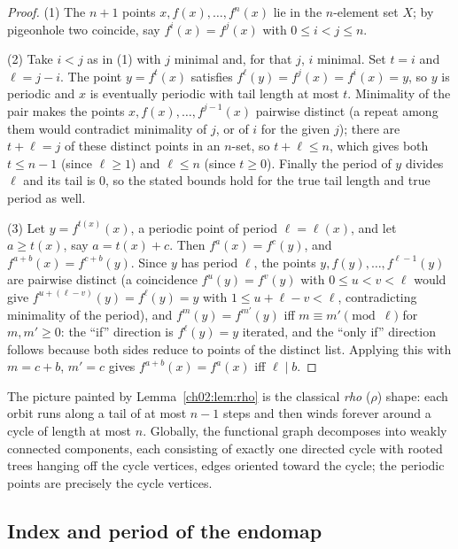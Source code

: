 \begin{proof}
(1) The $n + 1$ points $x, f(x), \dots, f^n(x)$ lie in the $n$-element set
$X$; by pigeonhole two coincide, say $f^i(x) = f^j(x)$ with
$0 \leq i < j \leq n$.

(2) Take $i < j$ as in (1) with $j$ minimal and, for that $j$, $i$
minimal. Set $t = i$ and $\ell = j - i$. The point $y = f^t(x)$
satisfies $f^\ell(y) = f^{j}(x) = f^{i}(x) = y$, so $y$ is periodic and
$x$ is eventually periodic with tail length at most $t$. Minimality of the
pair makes the points $x, f(x), \dots, f^{j-1}(x)$ pairwise distinct
(a repeat among them would contradict minimality of $j$, or of $i$ for the
given $j$); there are $t + \ell = j$ of these distinct points in an
$n$-set, so $t + \ell \leq n$, which gives both $t \leq n - 1$ (since
$\ell \geq 1$) and $\ell \leq n$ (since $t \geq 0$). Finally the period of
$y$ divides $\ell$ and its tail is $0$, so the stated bounds hold for the
true tail length and true period as well.

(3) Let $y = f^{t(x)}(x)$, a periodic point of period $\ell = \ell(x)$,
and let $a \geq t(x)$, say $a = t(x) + c$. Then $f^a(x) = f^c(y)$, and
$f^{a+b}(x) = f^{c + b}(y)$. Since $y$ has period $\ell$, the points
$y, f(y), \dots, f^{\ell - 1}(y)$ are pairwise distinct (a coincidence
$f^u(y) = f^v(y)$ with $0 \leq u < v < \ell$ would give
$f^{u + (\ell - v)}(y)= f^{\ell}(y) = y$ with
$1 \le u + \ell - v < \ell$, contradicting minimality of the period), and
$f^{m}(y) = f^{m'}(y)$ iff $m \equiv m' \pmod{\ell}$ for
$m, m' \geq 0$: the ``if'' direction is $f^{\ell}(y) = y$ iterated, and
the ``only if'' direction follows because both sides reduce to points of
the distinct list. Applying this with $m = c + b$, $m' = c$ gives
$f^{a+b}(x) = f^a(x)$ iff $\ell \mid b$.
\end{proof}

The picture painted by Lemma~\ref{ch02:lem:rho} is the classical
\emph{rho} ($\rho$) shape: each orbit runs along a tail of at most
$n - 1$ steps and then winds forever around a cycle of length at most $n$.
Globally, the functional graph decomposes into weakly connected components,
each consisting of exactly one directed cycle with rooted trees hanging off
the cycle vertices, edges oriented toward the cycle; the periodic points
are precisely the cycle vertices.

\subsection{Index and period of the endomap}

